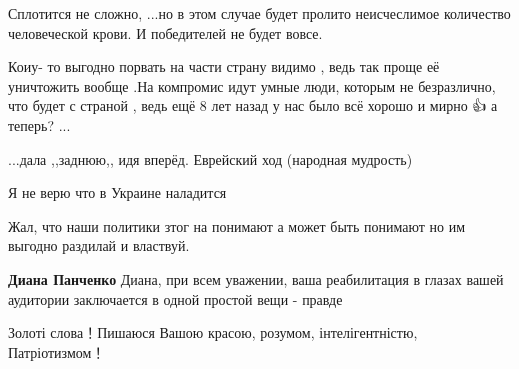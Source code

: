 \begin{itemize}
Сплотится не сложно, ...но в этом случае будет пролито неисчеслимое количество
человеческой крови. И победителей не будет вовсе.

 

Коиу- то выгодно порвать на части страну видимо , ведь так проще её уничтожить
вообще .На компромис идут умные люди, которым не безразлично, что будет с
страной , ведь ещё 8 лет назад у нас было всё хорошо и мирно 👍 а теперь? ...


 

...дала ,,заднюю,, идя вперёд. Еврейский ход (народная мудрость)

 
Я не верю что в Украине наладится

 
Жал, что наши политики зтог на понимают а может быть понимают но им выгодно раздилай и властвуй.

 
\textbf{Диана Панченко} Диана, при всем уважении, ваша реабилитация в глазах
вашей аудитории заключается в одной простой вещи - правде


Золоті слова！Пишаюся Вашою красою, розумом, інтелігентністю, Патріотизмом！

 

\end{itemize}
